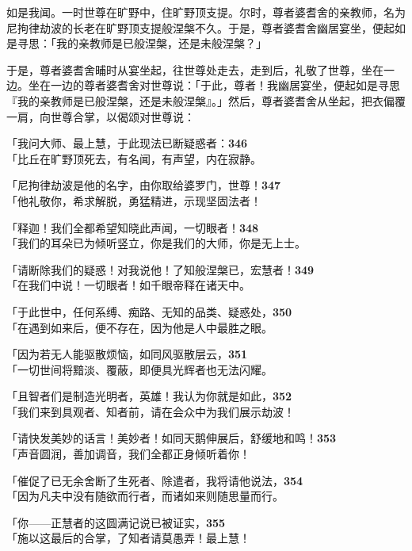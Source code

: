 如是我闻。一时世尊在旷野中，住旷野顶支提。尔时，尊者婆耆舍的亲教师，名为尼拘律劫波的长老在旷野顶支提般涅槃不久。于是，尊者婆耆舍幽居宴坐，便起如是寻思：「我的亲教师是已般涅槃，还是未般涅槃？」


于是，尊者婆耆舍晡时从宴坐起，往世尊处走去，走到后，礼敬了世尊，坐在一边。坐在一边的尊者婆耆舍对世尊说：「于此，尊者！我幽居宴坐，便起如是寻思『我的亲教师是已般涅槃，还是未般涅槃』。」然后，尊者婆耆舍从坐起，把衣偏覆一肩，向世尊合掌，以偈颂对世尊说：


「我问大师、最上慧，于此现法已断疑惑者：\hfill{\grayfootnotesize \textbf{346}} \\
「比丘在旷野顶死去，有名闻，有声望，内在寂静。


「尼拘律劫波是他的名字，由你取给婆罗门，世尊！\hfill{\grayfootnotesize \textbf{347}} \\
「他礼敬你，希求解脱，勇猛精进，示现坚固法者！


「释迦！我们全都希望知晓此声闻，一切眼者！\hfill{\grayfootnotesize \textbf{348}} \\
「我们的耳朵已为倾听竖立，你是我们的大师，你是无上士。


「请断除我们的疑惑！对我说他！了知般涅槃已，宏慧者！\hfill{\grayfootnotesize \textbf{349}} \\
「在我们中说！一切眼者！如千眼帝释在诸天中。


「于此世中，任何系缚、痴路、无知的品类、疑惑处，\hfill{\grayfootnotesize \textbf{350}} \\
「在遇到如来后，便不存在，因为他是人中最胜之眼。


「因为若无人能驱散烦恼，如同风驱散层云，\hfill{\grayfootnotesize \textbf{351}} \\
「一切世间将黯淡、覆蔽，即便具光辉者也无法闪耀。


「且智者们是制造光明者，英雄！我认为你就是如此，\hfill{\grayfootnotesize \textbf{352}} \\
「我们来到具观者、知者前，请在会众中为我们展示劫波！


「请快发美妙的话言！美妙者！如同天鹅伸展后，舒缓地和鸣！\hfill{\grayfootnotesize \textbf{353}} \\
「声音圆润，善加调音，我们全都正身倾听着你！


「催促了已无余舍断了生死者、除遣者，我将请他说法，\hfill{\grayfootnotesize \textbf{354}} \\
「因为凡夫中没有随欲而行者，而诸如来则随思量而行。


「你——正慧者的这圆满记说已被证实，\hfill{\grayfootnotesize \textbf{355}} \\
「施以这最后的合掌，了知者请莫愚弄！最上慧！


